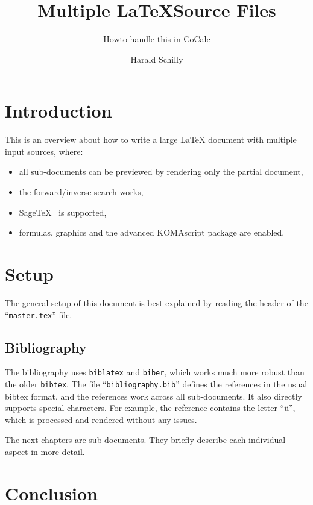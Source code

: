 \documentclass[12pt,
     DIV=12,
     twoside=false,
     twocolumn=false,
     abstraction,
     dottedtoc,
     headings=normal,
     headinclude=true,
     footinclude=true,
     parskip=half]{scrbook}
\title{Multiple \LaTeX Source Files}
\subtitle{Howto handle this in CoCalc}
\author{Harald Schilly}
\let\orgLaTeX\LaTeX
\renewcommand*{\LaTeX}{\orgLaTeX\xspace}
\begin{document}
\maketitle

\chapter{Introduction}

This is an overview about how to write a large \LaTeX document
with multiple input sources, where:

\begin{itemize}
\item all sub-documents can be previewed by rendering only the partial document,
\item the forward/inverse search works,
\item SageTeX~\cite{sagetex} is supported,
\item formulas, graphics and the advanced KOMAscript package are enabled.
\end{itemize}


\tableofcontents

\chapter{Setup}

The general setup of this document is best explained by reading the header
of the ``\texttt{master.tex}'' file.

\section{Bibliography}

The bibliography uses \texttt{biblatex} and \texttt{biber},
which works much more robust than the older \texttt{bibtex}.
The file ``\texttt{bibliography.bib}'' defines the references
in the usual bibtex format,
and the references work across all sub-documents.
It also directly supports special characters. For example, the \cite{komascript} reference contains the letter ``ü'',
which is processed and rendered without any issues.

The next chapters are sub-documents.
They briefly describe each individual aspect in more detail.






\chapter{Conclusion}

\printbibliography
\end{document}
